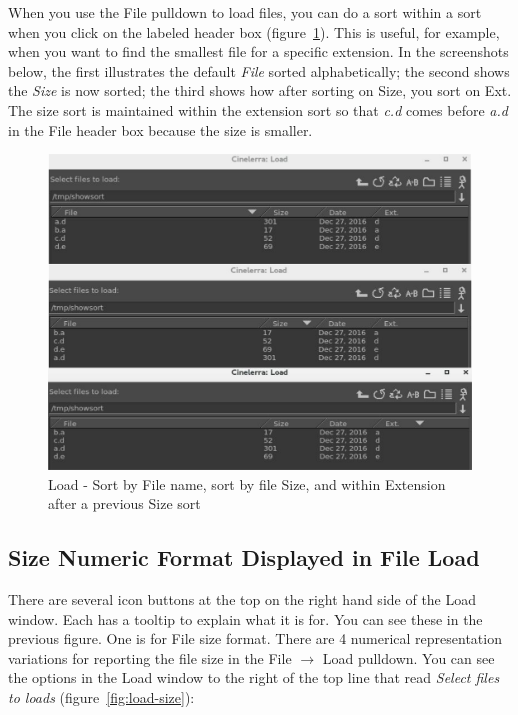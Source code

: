 When you use the File pulldown to load files, you can do a sort within a sort when you click on the labeled header box (figure~\ref{fig:load-sort}).  This is useful, for example, when you want to find the smallest file for a specific extension.   In the screenshots below, the first illustrates the default \textit{File} sorted alphabetically; the second shows the \textit{Size} is now sorted; the third shows how after sorting on Size, you sort on Ext.  The size sort is maintained within the extension sort so that \textit{c.d} comes before \textit{a.d} in the File header box because the size is smaller.

\begin{figure}[htpb]
    \centering
    \includegraphics[width=0.9\linewidth]{images/load-sort.png}
    \caption{Load - Sort by File name, sort by file Size, and within Extension after a previous Size sort}
    \label{fig:load-sort}
\end{figure}

\subsection{Size Numeric Format Displayed in File Load}%
\label{sub:size_numeric_format_displayed_file_load}

There are several icon buttons at the top on the right hand side of the Load window.  Each has a tooltip to explain what it is for.  You can see these in the previous figure.  One is for File size format.  There are 4 numerical representation variations for reporting the file size in the File $\rightarrow$ Load pulldown.    You can see the options in the Load window to the right of the top line that read \textit{Select files to loads} (figure~\ref{fig:load-size}):

